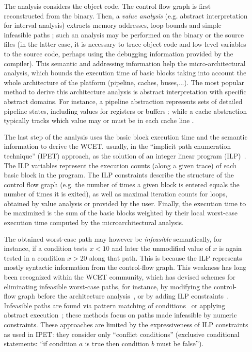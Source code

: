 \documentclass[a4paper,twocolumn,11pt]{article}
\begin{document}
The analysis considers the object code.
The control flow graph is first reconstructed from the binary.
Then, a \emph{value analysis} (e.g. abstract interpretation for interval analysis) extracts memory addresses, loop bounds and simple infeasible paths \parencite{gustafsson-et-RTSS06};
such an analysis may be performed on the binary or the source files (in the latter case, it is necessary to trace object code and low-level variables to the source code, perhaps using the debugging information provided by the compiler).
This semantic and addressing information help the micro-architectural analysis,
which bounds the execution time of basic blocks taking into account the whole architecture of the platform (pipeline, caches, buses,...)\parencite{DBLP:conf/emsoft/EngblomJ02,DBLP:phd/de/Reineke2009}.
The most popular method to derive this architecture analysis is abstract interpretation with specific abstract domains.
For instance, a pipeline abstraction represents sets of detailed pipeline states, including values for registers or buffers \parencite{DBLP:conf/emsoft/EngblomJ02}; while a cache abstraction typically tracks which value may or must be in each cache line \parencite{DBLP:phd/de/Reineke2009}.

The last step of the analysis uses the basic block execution time and the semantic information to derive the WCET, usually, in the ``implicit path enumeration technique'' (IPET) approach, as the solution of an integer linear program (ILP)~\parencite{li-et-CADICS97}.
The ILP variables represent the execution counts (along a given trace) of each basic block in the program. The ILP constraints describe the structure of the control flow graph (e.g. the number of times a given block is entered equals the number of times it is exited), as well as maximal iteration counts for loops, obtained by value analysis or provided by the user. Finally, the execution time to be maximized is the sum of the basic blocks weighted by their local worst-case execution time computed by the microarchitectural analysis.

The obtained worst-case path may however be \emph{infeasible} semantically,
for instance, if a condition tests $x<10$ and later the unmodified value of $x$ is again tested in a condition $x>20$ along that path.
This is because the ILP represents mostly syntactic information from the control-flow graph.
This weakness has long been recognized within the WCET community, which has devised schemes for eliminating infeasible worst-case paths, for instance, by modifying the control-flow graph before the architecture analysis~\parencite{negi-et-WCET04}, or by adding ILP constraints~\parencite{healy-et-TSE02,gustafsson-et-RTSS06}.
Infeasible paths are found via pattern matching of conditions~\parencite{healy-et-TSE02} or applying abstract execution~\parencite{gustafsson-et-RTSS06}; these methods focus on paths made infeasible by numeric constraints.
These approaches are limited by the expressiveness of ILP constraints as used in IPET: they consider only ``conflict conditions'' (exclusive conditional statements: ``if condition $a$ is true then condition $b$ must be false'').
\end{document}
